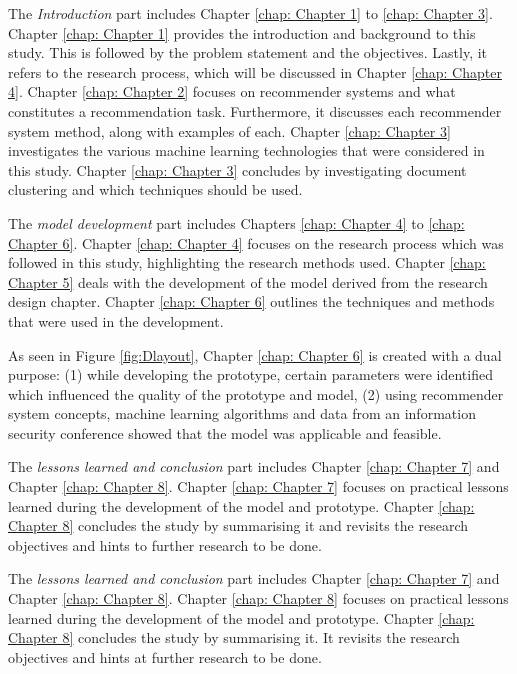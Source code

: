 The \textit{Introduction} part includes Chapter \ref{chap: Chapter 1} to \ref{chap: Chapter 3}.
Chapter \ref{chap: Chapter 1} provides the introduction and background to this study. This is followed by the problem statement and the objectives. Lastly, it refers to the research process, which will be discussed in Chapter \ref{chap: Chapter 4}. Chapter \ref{chap: Chapter 2} focuses on recommender systems and what constitutes a recommendation task. Furthermore, it discusses each recommender system method, along with examples of each. Chapter \ref{chap: Chapter 3} investigates the various machine learning technologies that were considered in this study. Chapter \ref{chap: Chapter 3} concludes by investigating document clustering and which techniques should be used.

The \textit{model development} part includes Chapters \ref{chap: Chapter 4} to \ref{chap: Chapter 6}. Chapter \ref{chap: Chapter 4} focuses on the research process which was followed in this study, highlighting the research methods used. Chapter \ref{chap: Chapter 5} deals with the development of the model derived from the research design chapter. Chapter \ref{chap: Chapter 6} outlines the techniques and methods that were used in the development. 

As seen in Figure \ref{fig:Dlayout}, Chapter \ref{chap: Chapter 6} is created with a dual purpose: (1) while developing the prototype, certain parameters were identified which influenced the quality of the prototype and model, (2) using recommender system concepts, machine learning algorithms and data from an information security conference showed that the model was applicable and feasible.

The \textit{lessons learned and conclusion} part includes Chapter \ref{chap: Chapter 7} and Chapter \ref{chap: Chapter 8}. 
Chapter \ref{chap: Chapter 7} focuses on practical lessons learned during the development of the model and prototype. Chapter \ref{chap: Chapter 8} concludes the study by summarising it and revisits the research objectives and hints to further research to be done.


The \textit{lessons learned and conclusion} part includes Chapter \ref{chap: Chapter 7} and Chapter \ref{chap: Chapter 8}. Chapter \ref{chap: Chapter 8} focuses on practical lessons learned during the development of the model and prototype. Chapter \ref{chap: Chapter 8} concludes the study by summarising it. It revisits the research objectives and hints at further research to be done.

